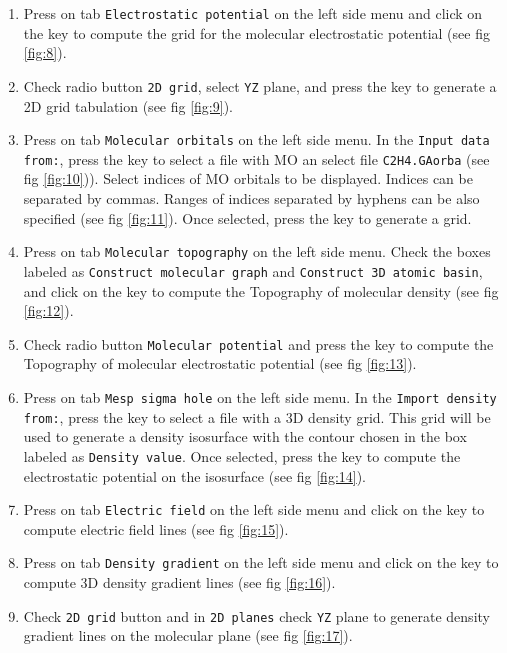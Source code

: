 \documentclass[a4paper,10pt]{article}
\begin{document}
\begin{enumerate}
\item Press on tab \texttt{Electrostatic potential} on the left side menu and
click on the \exec key to compute the grid for the molecular electrostatic
potential (see fig \ref{fig:8}).

\item Check radio button \texttt{2D grid}, select \texttt{YZ} plane, 
and press the \exec key to generate
a 2D grid tabulation (see fig \ref{fig:9}).

\item Press on tab \texttt{Molecular orbitals} on the left side menu. 
In the \texttt{Input data from:}, press the \teclapuntos key to select a file with MO 
an select file \texttt{C2H4.GAorba} (see fig \ref{fig:10})).
Select indices of MO orbitals to be displayed. Indices can be separated by commas.
Ranges of indices separated by hyphens can be also specified (see fig \ref{fig:11}).
Once selected, press the \exec key to generate a grid.

\item Press on tab \texttt{Molecular topography} on the left side menu. Check
the boxes labeled as \texttt{Construct molecular graph} and
\texttt{Construct 3D atomic basin}, and
click on the \exec key to compute the Topography of molecular density (see fig
\ref{fig:12}).

\item Check radio button \texttt{Molecular potential} and press the \exec key 
to compute the Topography of molecular electrostatic potential (see fig \ref{fig:13}).

\item Press on tab \texttt{Mesp sigma hole} on the left side menu.
In the \texttt{Import density from:}, press the \teclapuntos key to select a file with 
a 3D density grid. This grid will be used to generate a density isosurface
with the contour chosen in the box labeled as \texttt{Density value}.
Once selected, press the \exec key to compute the electrostatic potential
on the isosurface (see fig \ref{fig:14}).

\item Press on tab \texttt{Electric field} on the left side menu and
click on the \exec key to compute electric field lines
(see fig \ref{fig:15}).

\item Press on tab \texttt{Density gradient} on the left side menu and
click on the \exec key to compute 3D density gradient lines
(see fig \ref{fig:16}). 

\item Check \texttt{2D grid} button and
in \texttt{2D planes} check \texttt{YZ} plane
to generate density gradient lines on the molecular plane (see fig \ref{fig:17}).


\end{enumerate}
\end{document}
